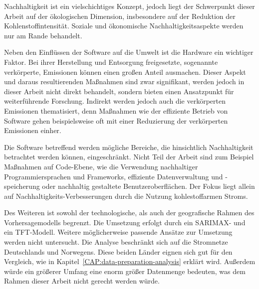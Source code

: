 Nachhaltigkeit ist ein vielschichtiges Konzept, jedoch liegt der Schwerpunkt dieser Arbeit auf der ökologischen Dimension, insbesondere auf der Reduktion der Kohlenstoffintensität.
Soziale und ökonomische Nachhaltigkeitsaspekte werden nur am Rande behandelt.

Neben den Einflüssen der Software auf die Umwelt ist die Hardware ein wichtiger Faktor.
Bei ihrer Herstellung und Entsorgung freigesetzte, sogenannte verkörperte, Emissionen können einen großen Anteil ausmachen.
Dieser Aspekt und daraus resultierenden Maßnahmen sind zwar signifikant, werden jedoch in dieser Arbeit nicht direkt behandelt, sondern bieten einen Ansatzpunkt für weiterführende Forschung.
Indirekt werden jedoch auch die verkörperten Emissionen thematisiert, denn Maßnahmen wie der effiziente Betrieb von Software gehen beispielsweise oft mit einer Reduzierung der verkörperten Emissionen einher.

Die Software betreffend werden mögliche Bereiche, die hinsichtlich Nachhaltigkeit betrachtet werden können, eingeschränkt.
Nicht Teil der Arbeit sind zum Beispiel Maßnahmen auf Code-Ebene, wie die Verwendung nachhaltiger Programmiersprachen und Frameworks, effiziente Datenverwaltung und -speicherung oder nachhaltig gestaltete Benutzeroberflächen.
Der Fokus liegt allein auf Nachhaltigkeits-Verbesserungen durch die Nutzung kohlestoffarmen Stroms.


Des Weiteren ist sowohl der technologische, als auch der geografische Rahmen des Vorhersagemodells begrenzt.
Die Umsetzung erfolgt durch ein \ac{SARIMAX}- und ein \ac{TFT}-Modell.
Weitere möglicherweise passende Ansätze zur Umsetzung werden nicht untersucht.
Die Analyse beschränkt sich auf die Stromnetze Deutschlands und Norwegens.
Diese beiden Länder eignen sich gut für den Vergleich, wie in Kapitel~\ref{CAP:data-preparation-analysis} erklärt wird.
Außerdem würde ein größerer Umfang eine enorm größer Datenmenge bedeuten, was dem Rahmen dieser Arbeit nicht gerecht werden würde.

